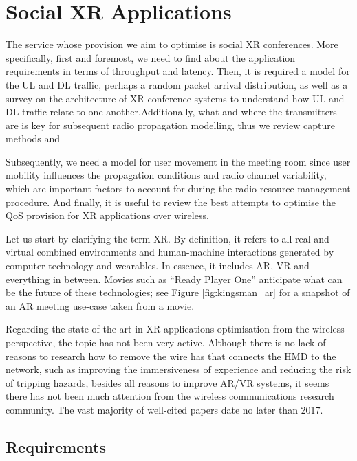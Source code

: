 \section{Social XR Applications}
\label{sec:sxr_applications}

The service whose provision we aim to optimise is social XR conferences. More specifically, first and foremost, we need to find about the application requirements in terms of throughput and latency. Then, it is required a model for the \ac{UL} and \ac{DL} traffic, perhaps a random packet arrival distribution, as well as a survey on the architecture of XR conference systems to understand how \ac{UL} and \ac{DL} traffic relate to one another.Additionally, what and where the transmitters are is key for subsequent radio propagation modelling, thus we review capture methods and 

Subsequently, we need a model for user movement in the meeting room since user mobility influences the propagation conditions and radio channel variability, which are important factors to account for during the radio resource management procedure. And finally, it is useful to review the best attempts to optimise the \ac{QoS} provision for XR applications over wireless.

Let us start by clarifying the term \ac{XR}. By definition, it refers to all real-and-virtual combined environments and human-machine interactions generated by computer technology and wearables. In essence, it includes \ac{AR}, \ac{VR} and everything in between. Movies such as ``Ready Player One'' \cite{readyPlayerOne} anticipate what can be the future of these technologies; see Figure \ref{fig:kingsman_ar} for a snapshot of an AR meeting use-case taken from a movie.



Regarding the state of the art in XR applications optimisation from the wireless perspective, the topic has not been very active. Although there is no lack of reasons to research how to remove the wire has that connects the \ac{HMD} to the network, such as improving the immersiveness of experience and reducing the risk of tripping hazards, besides all reasons to improve \ac{AR}/\ac{VR} systems, it seems there has not been much attention from the wireless communications research community. The vast majority of well-cited papers date no later than 2017.

\subsection*{Requirements}

